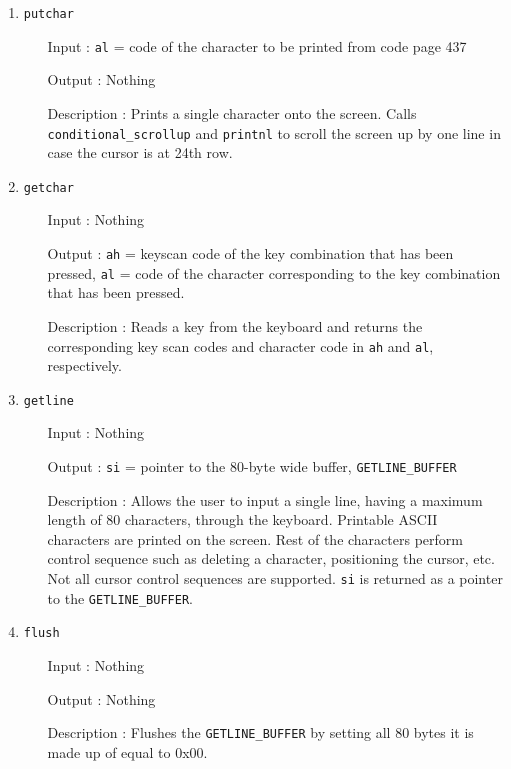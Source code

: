 \begin{enumerate}
\begin{enumerate}[align=parleft, labelsep=2cm, leftmargin=1.06in]
  		\end{enumerate}
  \item \texttt{putchar}
  		\begin{enumerate}[align=parleft, labelsep=2cm, leftmargin=1.06in]
  		  \item[Input]: \texttt{al} = code of the character to be printed from code page 437
  		  \item[Output]: Nothing
  		  \item[Description]: Prints a single character onto the screen. Calls \texttt{conditional\_scrollup} and \texttt{printnl} to scroll the screen up by one line in case the cursor is at 24th row.
  		\end{enumerate}
  \item \texttt{getchar}
  		\begin{enumerate}[align=parleft, labelsep=2cm, leftmargin=1.06in]
  		  \item[Input]: Nothing
  		  \item[Output]: \texttt{ah} = keyscan code of the key combination that has been pressed, \texttt{al} = code of the character corresponding to the key combination that has been pressed. 
  		  \item[Description]: Reads a key from the keyboard and returns the corresponding key scan codes and character code in \texttt{ah} and \texttt{al}, respectively.
  		\end{enumerate}
  \item \texttt{getline}
  		\begin{enumerate}[align=parleft, labelsep=2cm, leftmargin=1.06in]
  		  \item[Input]: Nothing
  		  \item[Output]: \texttt{si} = pointer to the 80-byte wide buffer, \texttt{GETLINE\_BUFFER}
  		  \item[Description]: Allows the user to input a single line, having a maximum length of 80 characters, through the keyboard. Printable ASCII characters are printed on the screen. Rest of the characters perform control sequence such as deleting a character, positioning the cursor, etc. Not all cursor control sequences are supported. \texttt{si} is returned as a pointer to the \texttt{GETLINE\_BUFFER}.
  		\end{enumerate}
  \item \texttt{flush}
  		\begin{enumerate}[align=parleft, labelsep=2cm, leftmargin=1.06in]
  		  \item[Input]: Nothing
  		  \item[Output]: Nothing
  		  \item[Description]: Flushes the \texttt{GETLINE\_BUFFER} by setting all 80 bytes it is made up of equal to 0x00.
  		\end{enumerate}
\end{enumerate}
